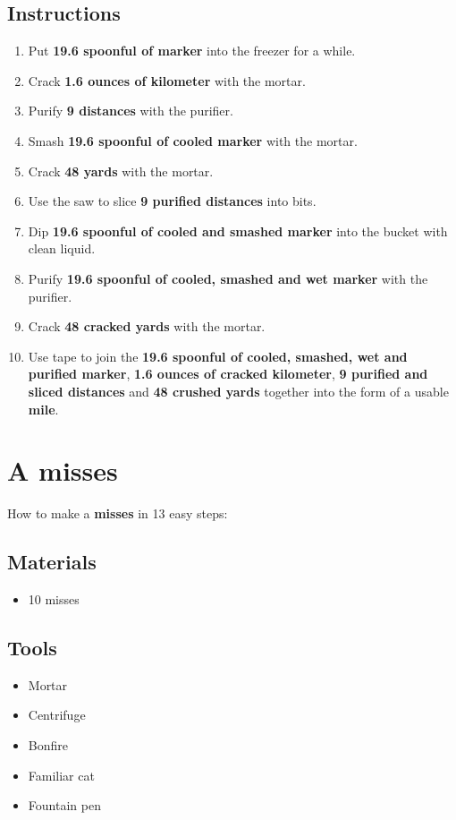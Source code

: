 \documentclass{article}
\begin{document}
\subsection{Instructions}\begin{enumerate}
\item 
Put \textbf{19.6 spoonful of marker} into the freezer for a while.
\item 
Crack \textbf{1.6 ounces of kilometer} with the mortar.
\item 
Purify \textbf{9 distances} with the purifier.
\item 
Smash \textbf{19.6 spoonful of cooled marker} with the mortar.
\item 
Crack \textbf{48 yards} with the mortar.
\item 
Use the saw to slice \textbf{9 purified distances} into bits.
\item 
Dip \textbf{19.6 spoonful of cooled and smashed marker} into the bucket with clean liquid.
\item 
Purify \textbf{19.6 spoonful of cooled, smashed and wet marker} with the purifier.
\item 
Crack \textbf{48 cracked yards} with the mortar.
\item 
Use tape to join the \textbf{19.6 spoonful of cooled, smashed, wet and purified marker}, \textbf{1.6 ounces of cracked kilometer}, \textbf{9 purified and sliced distances} and \textbf{48 crushed yards} together into the form of a usable \textbf{mile}.
\end{enumerate}
\newpage
\section{A misses}How to make a \textbf{misses} in 13 easy steps:

\subsection{Materials}\begin{itemize}
\item 
10 misses
\end{itemize}
\subsection{Tools}\begin{itemize}
\item 
Mortar
\item 
Centrifuge
\item 
Bonfire
\item 
Familiar cat
\item 
Fountain pen
\end{itemize}
\end{document}
